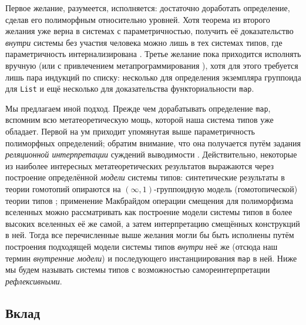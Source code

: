 Первое желание, разумеется, исполняется: достаточно
доработать определение, сделав его полиморфным
относительно уровней. Хотя теорема из второго желания
уже верна в системах с параметричностью, получить её
доказательство \textit{внутри} системы без участия
человека можно лишь в тех системах типов, где
параметричность интернализирована
\cite{Bernardy:Parametricity2010,
Altenkirch:Parametricity2024}. Третье желание пока
приходится исполнять вручную (или с привлечением
метапрограммирования \cite{Nawrocki:Lean2026}), хотя
для этого требуется лишь пара индукций по списку:
несколько для определения экземпляра группоида для
\texttt{List} и ещё несколько для доказательства
функториальности \texttt{map}.

Мы предлагаем иной подход. Прежде чем дорабатывать
определение \texttt{map}, вспомним всю
метатеоретическую мощь, которой наша система типов уже
обладает. Первой на ум приходит упомянутая выше
параметричность полиморфных определений; обратим
внимание, что она получается путём задания
\textit{реляционной интерпретации} суждений выводимости
\cite{reynolds1983types}. Действительно, некоторые из
наиболее интересных метатеоретических результатов
выражаются через построение определённой
\textit{модели} системы типов: синтетические результаты
в теории гомотопий опираются на
$(\infty, 1)$-группоидную модель (гомотопической)
теории типов
\cite{HofmannStreicher-Thegroupoidmodelref,
altenkirch:groupoids}; применение Макбрайдом операции
смещения для полиморфизма вселенных
\cite{McBride:Crude2011,McBride:Crude2012} можно
рассматривать как построение модели системы типов в
более высоких вселенных её же самой, а затем
интерпретацию смещённых конструкций в ней. Тогда все
перечисленные выше желания могли бы быть исполнены
путём построения подходящей модели системы типов
\textit{внутри} неё же (отсюда наш термин
\textit{внутренние модели}) и последующего
инстанциирования \texttt{map} в ней. Ниже мы будем
называть системы типов с возможностью
самореинтерпретации \textit{рефлексивными}.

\subsection{Вклад}

